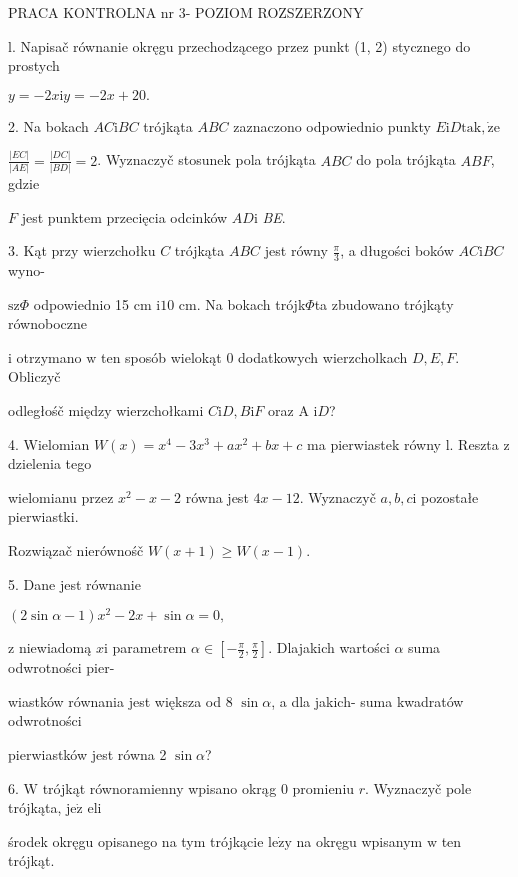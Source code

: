 \documentclass[a4paper,12pt]{article}
\begin{document}
PRACA KONTROLNA nr 3- POZIOM ROZSZERZONY

l. Napisač równanie okręgu przechodzącego przez punkt (1, 2) stycznego do prostych

$y=-2x\mathrm{i}y=-2x+20.$

2. Na bokach $AC \mathrm{i} BC$ trójkąta $ABC$ zaznaczono odpowiednio punkty $E \mathrm{i} D \mathrm{t}\mathrm{a}\mathrm{k}, \dot{\mathrm{z}}\mathrm{e}$

$\displaystyle \frac{|EC|}{|AE|}=\frac{|DC|}{|BD|}=2$. Wyznaczyč stosunek pola trójkąta $ABC$ do pola trójkąta $ABF$, gdzie

$F$ jest punktem przecięcia odcinków $AD\mathrm{i}$ {\it BE}.

3. Kąt przy wierzchołku $C$ trójkąta $ABC$ jest równy $\displaystyle \frac{\pi}{3}$, a długości boków $AC\mathrm{i}BC$ wyno-

$\mathrm{s}\mathrm{z}\Phi$ odpowiednio 15 cm $\mathrm{i}10$ cm. Na bokach trójk$\Phi$ta zbudowano trójkąty równoboczne

$\mathrm{i}$ otrzymano $\mathrm{w}$ ten sposób wielokąt $0$ dodatkowych wierzcholkach $D, E, F$. Obliczyč

odległośč między wierzchołkami $C\mathrm{i}D, B\mathrm{i}F$ oraz A $\mathrm{i}D$?

4. Wielomian $W(x)=x^{4}-3x^{3}+ax^{2}+bx+c$ ma pierwiastek równy l. Reszta $\mathrm{z}$ dzielenia tego

wielomianu przez $x^{2}-x-2$ równa jest $4x-12$. Wyznaczyč $a, b, c\mathrm{i}$ pozostałe pierwiastki.

Rozwiązač nierównośč $W(x+1)\geq W(x-1).$

5. Dane jest równanie

$(2\sin\alpha-1)x^{2}-2x+\sin\alpha=0,$

$\mathrm{z}$ niewiadomą $x\mathrm{i}$ parametrem $\alpha\in [-\displaystyle \frac{\pi}{2},\frac{\pi}{2}]$. Dlajakich wartości $\alpha$ suma odwrotności pier-

wiastków równania jest większa od 8 $\sin\alpha$, a dla jakich- suma kwadratów odwrotności

pierwiastków jest równa 2 $\sin\alpha$?

6. $\mathrm{W}$ trójkąt równoramienny wpisano okrąg $0$ promieniu $r$. Wyznaczyč pole trójkąta, $\mathrm{j}\mathrm{e}\dot{\mathrm{z}}$ eli

środek okręgu opisanego na tym trójkącie $\mathrm{l}\mathrm{e}\dot{\mathrm{z}}\mathrm{y}$ na okręgu wpisanym $\mathrm{w}$ ten trójkąt.
\end{document}
